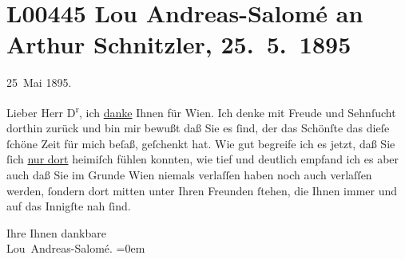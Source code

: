 

\section[Lou Andreas-Salomé an Arthur Schnitzler, 25. 5. 1895]{L00445 Lou Andreas-Salomé an Arthur Schnitzler, 25. 5. 1895}
\nopagebreak{}
\rehead{ }\normalsize\beginnumbering{}
\toendnotes[C]{\smallbreak\pagebreak[2]}
\toendnotes[C]{\smallbreak}
\pstart
           {\pb}25 Mai 1895.\pend
           
\pstart{}Lieber Herr D\textsuperscript{r},\pend\vspace{0.5em}
\pstart
           ich \uline{danke} Ihnen für Wien. Ich denke mit Freude und Sehnſucht dorthin zurück und bin mir bewußt
               daß Sie es{ }ſind, der das Schönſte das dieſe{ }ſchöne Zeit für mich beſaß, geſchenkt
               hat. Wie gut begreife ich es jetzt, daß Sie{ }ſich \uline{nur
                  dort} heimiſch fühlen konnten, wie tief und deutlich empfand ich es aber auch
               daß Sie im Grunde Wien niemals verlaſſen haben
               noch auch verlaſſen werden,{ }ſondern dort mitten {\pb}unter Ihren Freunden{ }ſtehen, die Ihnen immer und auf das Innigſte nah{ }ſind.\pend
           
\pstart
           Ihre Ihnen dankbare{\\[\baselineskip]}\spacefill\mbox{Lou Andreas-Salomé.}\pend
           \leftskip=0em{}\endnumbering{}  \newcommand{\dateiname}{L00445}\newcommand{\titel}{Lou Andreas-Salomé an Arthur Schnitzler, 25. 5. 1895}\newcommand{\editorInnen}{Martin Anton Müller und Gerd-Hermann Susen}
